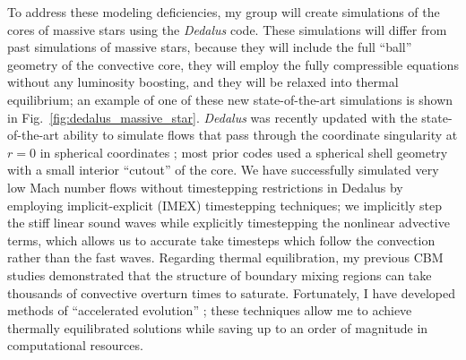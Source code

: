 \documentclass[12pt]{article}
\begin{document}

To address these modeling deficiencies, my group will create simulations of the cores of massive stars using the \emph{Dedalus} \citep{burns_etal_2020} code.
These simulations will differ from past simulations of massive stars, because they will include the full ``ball'' geometry of the convective core, they will employ the fully compressible equations without any luminosity boosting, and they will be relaxed into thermal equilibrium; an example of one of these new state-of-the-art simulations is shown in Fig.~\ref{fig:dedalus_massive_star}.
\emph{Dedalus} was recently updated with the state-of-the-art ability to simulate flows that pass through the coordinate singularity at $r = 0$ in spherical coordinates \citep{vasil_etal_2019,lecoanet_etal_2019}; most prior codes used a spherical shell geometry with a small interior ``cutout'' of the core.
We have successfully simulated very low Mach number flows without timestepping restrictions in Dedalus by employing implicit-explicit (IMEX) timestepping techniques; we implicitly step the stiff linear sound waves while explicitly timestepping the nonlinear advective terms, which allows us to accurate take timesteps which follow the convection rather than the fast waves.
Regarding thermal equilibration, my previous CBM studies \citep{anders_etal_2022a,anders_etal_2022b} demonstrated that the structure of boundary mixing regions can take thousands of convective overturn times to saturate.
Fortunately, I have developed methods of ``accelerated evolution'' \citep{anders_etal_2018}; these techniques allow me to achieve thermally equilibrated solutions while saving up to an order of magnitude in computational resources.
\end{document}
